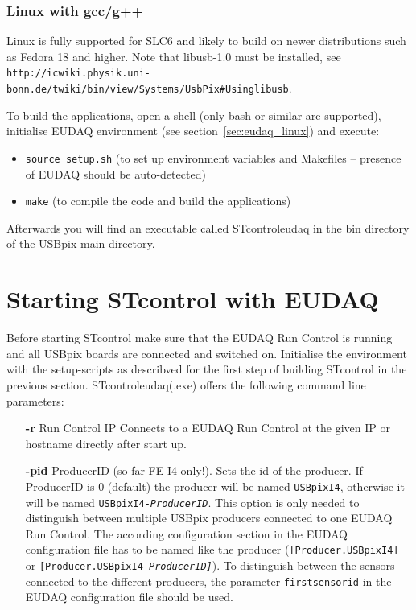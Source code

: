 \documentclass[a4paper,12pt]{article}
\begin{document}
\subsubsection{Linux with gcc/g++}

Linux is fully supported for SLC6 and likely to build on newer distributions such as Fedora 18 and higher. 
Note that libusb-1.0 must be installed, see \\
{\tt http://icwiki.physik.uni-bonn.de/twiki/bin/view/Systems/UsbPix\#Using\textunderscore libusb}.

To build the applications, open a shell (only bash or similar are supported), 
initialise EUDAQ environment (see section~\ref{sec:eudaq_linux}) and
execute:
\begin{itemize}
\item {\tt source setup.sh} 
(to set up environment variables and Makefiles -- presence of EUDAQ should be auto-detected)
\item {\tt make} (to compile the code and build the applications)
\end{itemize}
Afterwards you will find an executable called STcontrol\textunderscore eudaq in the bin
directory of the USBpix main directory.

\section{Starting STcontrol with EUDAQ}

Before starting STcontrol make sure that the EUDAQ Run Control is running and all
USBpix boards are connected and switched on.
Initialise the environment with the setup-scripts as describved for the first step
of building STcontrol in the previous section. STcontrol\textunderscore eudaq(.exe)
offers the following command line parameters:
\begin{itemize}
\item[\bf -r] Run Control IP Connects to a EUDAQ Run Control at the given IP or hostname
directly after start up.
\item[\bf -pid] ProducerID (so far FE-I4 only!). Sets the id of the producer. 
If ProducerID is 0 (default)
the producer will be named {\tt USBpixI4}, otherwise it will be named 
{\tt USBpixI4-\it ProducerID}. This option is only needed to distinguish between multiple USBpix
producers connected to one EUDAQ Run Control. The according configuration
section in the EUDAQ configuration file has to be named like the producer 
({\tt [Producer.USBpixI4]} or {\tt [Producer.USBpixI4-\it ProducerID\tt ]}). 
To distinguish between the sensors connected to the different producers, the parameter 
{\tt first\textunderscore sensor\textunderscore id} in the
EUDAQ configuration file should be used.
\end{itemize}
\end{document}
